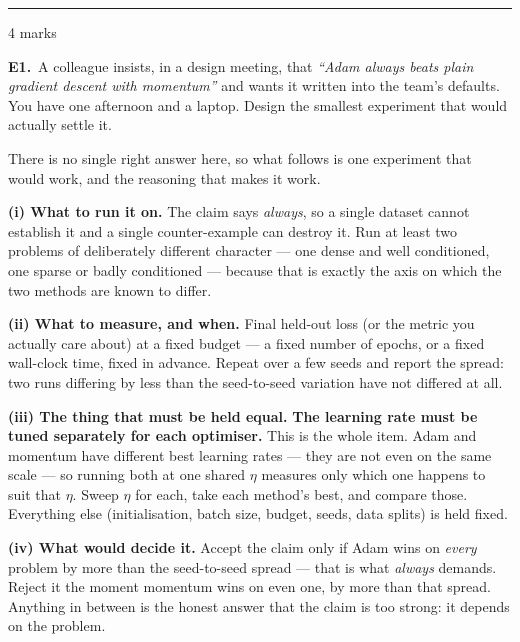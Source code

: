 \documentclass[10pt,a4paper]{article}
\newcommand{\parthead}[2]{\vspace{2pt}\noindent\rule{\linewidth}{0.4pt}\par\vspace{2pt}%
  \noindent{\bfseries Part #1}\hfill{\small #2}\par\vspace{1pt}}
\begin{document}
\newpage

\parthead{E --- Reasoning}{4 marks}

\textbf{E1.}\ A colleague insists, in a design meeting, that \emph{``Adam always beats plain gradient descent with
momentum''} and wants it written into the team's defaults. You have one afternoon and a laptop. Design the
smallest experiment that would actually settle it.

\vspace{4pt}

There is no single right answer here, so what follows is one experiment that would work, and the reasoning that makes it work.\par\vspace{1mm}\textbf{(i) What to run it on.} The claim says \emph{always}, so a single dataset cannot establish it and a single counter-example can destroy it. Run at least two problems of deliberately different character --- one dense and well conditioned, one sparse or badly conditioned --- because that is exactly the axis on which the two methods are known to differ.\par\vspace{1mm}\textbf{(ii) What to measure, and when.} Final held-out loss (or the metric you actually care about) at a fixed budget --- a fixed number of epochs, or a fixed wall-clock time, fixed in advance. Repeat over a few seeds and report the spread: two runs differing by less than the seed-to-seed variation have not differed at all.\par\vspace{1mm}\textbf{(iii) The thing that must be held equal.} \textbf{The learning rate must be tuned separately for each optimiser.} This is the whole item. Adam and momentum have different best learning rates --- they are not even on the same scale --- so running both at one shared $\eta$ measures only which one happens to suit that $\eta$. Sweep $\eta$ for each, take each method's best, and compare those. Everything else (initialisation, batch size, budget, seeds, data splits) is held fixed.\par\vspace{1mm}\textbf{(iv) What would decide it.} Accept the claim only if Adam wins on \emph{every} problem by more than the seed-to-seed spread --- that is what \emph{always} demands. Reject it the moment momentum wins on even one, by more than that spread. Anything in between is the honest answer that the claim is too strong: it depends on the problem.
\end{document}
